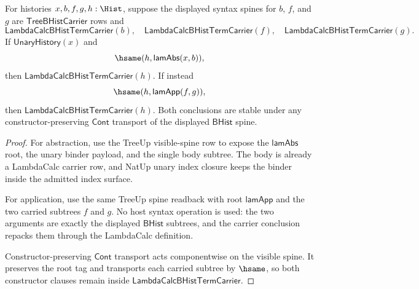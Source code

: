 \begin{theorem}
\label{thm:lambdacalc-abstraction-application-carrier-closure}
For histories $x,b,f,g,h:\Hist$, suppose the displayed syntax spines for $b$,
$f$, and $g$ are $\mathsf{TreeBHistCarrier}$ rows and
$$
\mathsf{LambdaCalcBHistTermCarrier}(b),\quad
\mathsf{LambdaCalcBHistTermCarrier}(f),\quad
\mathsf{LambdaCalcBHistTermCarrier}(g).
$$
If $\mathsf{UnaryHistory}(x)$ and
$$
\hsame(h,\mathsf{lamAbs}(x,b)),
$$
then $\mathsf{LambdaCalcBHistTermCarrier}(h)$. If instead
$$
\hsame(h,\mathsf{lamApp}(f,g)),
$$
then $\mathsf{LambdaCalcBHistTermCarrier}(h)$. Both conclusions are stable
under any constructor-preserving $\mathsf{Cont}$ transport of the displayed
$\mathsf{BHist}$ spine.
\end{theorem}
\begin{proof}
For abstraction, use the TreeUp visible-spine row to expose the
$\mathsf{lamAbs}$ root, the unary binder payload, and the single body subtree.
The body is already a LambdaCalc carrier row, and NatUp unary index closure
keeps the binder inside the admitted index surface.

For application, use the same TreeUp spine readback with root
$\mathsf{lamApp}$ and the two carried subtrees $f$ and $g$. No host syntax
operation is used: the two arguments are exactly the displayed $\mathsf{BHist}$
subtrees, and the carrier conclusion repacks them through the LambdaCalc
definition.

Constructor-preserving $\mathsf{Cont}$ transport acts componentwise on the
visible spine. It preserves the root tag and transports each carried subtree by
$\hsame$, so both constructor clauses remain inside
$\mathsf{LambdaCalcBHistTermCarrier}$.
\end{proof}

